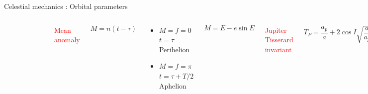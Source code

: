 \documentclass{beamer}
\begin{document}
\begin{frame}{Celestial mechanics \cite{murray1999solar}: Orbital parameters}
\begin{columns}
\begin{figure}[h]
\begin{center}
\includegraphics[width=\textwidth ]{Pic/Mean_anomaly.png}
\caption{\cite{murray1999solar}}
\label{Area_dynamics}
\end{center}
\end{figure}
\begin{center}
\textcolor{red}{Mean anomaly}
\end{center}
\begin{equation}
M=n(t-\tau)
\end{equation}

\begin{center}
\begin{itemize}
\item $M=f=0$\quad$t=\tau$\quad Perihelion
\item $M=f=\pi$\quad$t=\tau+T/2$ \quad Aphelion
\end{itemize}
\end{center}

\begin{equation}
M=E-e\sin E
\end{equation}
\begin{center}
\textcolor{red}{Jupiter Tisserard invariant }
\end{center}
\begin{equation}
T_{P}=\frac{a_{p}}{a}+2\cos I\sqrt{\dfrac{a}{a_{p}}(1-e^{2})}
\end{equation}
\end{columns}
\end{frame}
\end{document}
